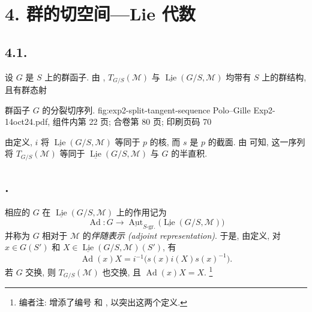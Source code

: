 
\setcounter{footnote}{48}

\section*{4. 群的切空间---Lie 代数}

\subsection*{4.1.}
设 \(G\) 是 \(S\) 上的群函子. 由 ,
\(T_{G/S}(\mathcal M)\) 与
\(\underline{\operatorname{Lie}}(G/S,\mathcal M)\) 均带有 \(S\) 上的群结构,
且有群态射

  {群函子 \(G\) 的分裂切序列.}
  {fig:exp2-split-tangent-sequence}
  {Polo--Gille Exp2-14oct24.pdf, 组件内第 22 页; 合卷第 80 页; 印刷页码 70}

由定义, \(i\) 将 \(\underline{\operatorname{Lie}}(G/S,\mathcal M)\) 等同于
\(p\) 的核, 而 \(s\) 是 \(p\) 的截面.
由  可知, 这一序列将
\(T_{G/S}(\mathcal M)\) 等同于
\(\underline{\operatorname{Lie}}(G/S,\mathcal M)\) 与 \(G\) 的半直积.

\subsection*{.}
相应的 \(G\) 在 \(\underline{\operatorname{Lie}}(G/S,\mathcal M)\) 上的作用记为
\[
  \operatorname{Ad}:G\longrightarrow
  \underline{\operatorname{Aut}}_{S\text{-gr.}}
    \bigl(\underline{\operatorname{Lie}}(G/S,\mathcal M)\bigr)
\]
并称为 \(G\) 相对于 \(\mathcal M\) 的\emph{伴随表示 (adjoint representation)}.
于是, 由定义, 对 \(x\in G(S')\) 和
\(X\in\underline{\operatorname{Lie}}(G/S,\mathcal M)(S')\), 有
\[
  \operatorname{Ad}(x)X
  =i^{-1}\bigl(s(x)i(X)s(x)^{-1}\bigr).
\]
若 \(G\) 交换, 则 \(T_{G/S}(\mathcal M)\) 也交换, 且
\(\operatorname{Ad}(x)X=X\).
\footnote{编者注: 增添了编号 
和 , 以突出这两个定义.}

